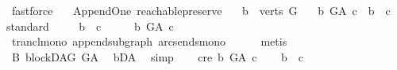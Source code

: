 \begin{isabellebody}
\ fastforce\ \isanewline
{}\isamarkupfalse%
%
\endisatagproof
{\isafoldproof}%
%
\isadelimproof
\isanewline
%
\endisadelimproof
\isanewline
\isanewline
{}\isamarkupfalse%
\ {\isacharparenleft}{\kern0pt}\ Append{\isacharunderscore}{\kern0pt}One{\isacharparenright}{\kern0pt}\ reachable{}{\isacharunderscore}{\kern0pt}preserve{\isacharcolon}{\kern0pt}\isanewline
\ \ \ {\isachardoublequoteopen}b\ {\isasymin}\ verts\ G{\isachardoublequoteclose}\isanewline
\ \ \ {\isachardoublequoteopen}{\isacharparenleft}{\kern0pt}b\ {\isasymrightarrow}\isactrlsup {\isacharplus}{\kern0pt}\isactrlbsub G{\isacharunderscore}{\kern0pt}A\isactrlesub \ c{\isacharparenright}{\kern0pt}\ {\isasymlongleftrightarrow}\ b\ {\isasymrightarrow}\isactrlsup {\isacharplus}{\kern0pt}\ c{\isachardoublequoteclose}\isanewline
%
\isadelimproof
%
\endisadelimproof
%
\isatagproof
{}\isamarkupfalse%
{\isacharparenleft}{\kern0pt}standard{\isacharparenright}{\kern0pt}\isanewline
\ \ \isamarkupfalse%
\ \ {\isachardoublequoteopen}b\ {\isasymrightarrow}\isactrlsup {\isacharplus}{\kern0pt}\ c{\isachardoublequoteclose}\isanewline
\ \ \isamarkupfalse%
\ \isamarkupfalse%
\ {\isachardoublequoteopen}b\ {\isasymrightarrow}\isactrlsup {\isacharplus}{\kern0pt}\isactrlbsub G{\isacharunderscore}{\kern0pt}A\isactrlesub \ c{\isachardoublequoteclose}\isanewline
\ \ \ \ \isamarkupfalse%
\ trancl{\isacharunderscore}{\kern0pt}mono\ append{\isacharunderscore}{\kern0pt}subgraph\ arcs{\isacharunderscore}{\kern0pt}ends{\isacharunderscore}{\kern0pt}mono\isanewline
\ \ \ \ \isamarkupfalse%
\ {\isacharparenleft}{\kern0pt}metis{\isacharparenright}{\kern0pt}\ \ \isanewline
{}\isamarkupfalse%
\ \isanewline
\ \ \isamarkupfalse%
\ B{}{\isacharcolon}{\kern0pt}\ blockDAG\ {\isachardoublequoteopen}G{\isacharunderscore}{\kern0pt}A{\isachardoublequoteclose}\ \isamarkupfalse%
\ bD{\isacharunderscore}{\kern0pt}A\ \isamarkupfalse%
\ simp\isanewline
\ \ \isamarkupfalse%
\ c{\isacharunderscore}{\kern0pt}re{\isacharcolon}{\kern0pt}\ {\isachardoublequoteopen}b\ {\isasymrightarrow}\isactrlsup {\isacharplus}{\kern0pt}\isactrlbsub G{\isacharunderscore}{\kern0pt}A\isactrlesub \ c{\isachardoublequoteclose}\isanewline
\ \ \isamarkupfalse%
\ {\isachardoublequoteopen}b\ {\isasymrightarrow}\isactrlsup {\isacharplus}{\kern0pt}\ c{\isachardoublequoteclose}\ \ \ \isanewline

\end{isabellebody}
